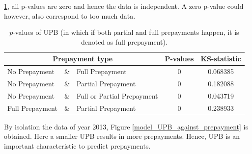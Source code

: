         \ref{model_Pvals_of_UPB}, all p-values are zero and hence 
        the data is independent. A zero p-value could however, also 
        correspond to too much data. 
        \begin{table}[H]
        \centering
            \begin{tabular}{lcl|c|c}
                \multicolumn{3}{c|}{Prepayment type} 
                & P-values& KS-statistic \\\hline
                No Prepayment & \& & Full Prepayment & 0 & 0.068385\\
                No Prepayment & \& & Partial Prepayment & 0 & 0.182088\\
                No Prepayment & \& & Full or Partial Prepayment & 0 & 0.043719 \\
                Full Prepayment & \& & Partial Prepayment & 0 & 0.238933
		    \end{tabular}
            \caption{
                $p$-values of UPB (in which if both partial and full 
                prepayments happen, it is denoted as full prepayment).
                }
	        \label{model_Pvals_of_UPB}
        \end{table}
        \noindent
        By isolation the data of year 2013, Figure 
        \ref{model_UPB_against_prepayment} is obtained. Here a smaller 
        UPB results in more prepayments. Hence, UPB is an 
        important characteristic to predict prepayments. 
